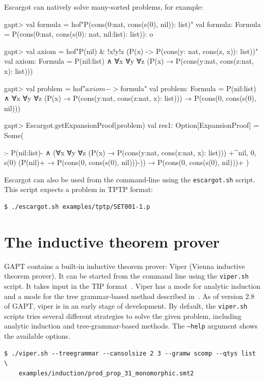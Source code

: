 \documentclass[a4paper,11pt]{book}
\newcommand{\cli}[1]{{\ttfamily {#1}}}
\begin{document}
Escargot can natively solve many-sorted problems, for example:
\begin{clilisting}
gapt> val formula = hof"P(cons(0:nat, cons(s(0), nil)): list)"
val formula: Formula = P(cons(0:nat, cons(s(0): nat, nil:list): list)): o

gapt> val axiom = hof"P(nil) & !x!y!z (P(x) -> P(cons(y: nat, cons(z, x)): list))"
val axiom: Formula = P(nil:list) ∧ ∀x ∀y ∀z (P(x) → P(cons(y:nat, cons(z:nat, x): list)))

gapt> val problem = hof"$axiom -> $formula"
val problem: Formula = P(nil:list) ∧ ∀x ∀y ∀z (P(x) → P(cons(y:nat, cons(z:nat, x): list))) →
  P(cons(0, cons(s(0), nil)))

gapt> Escargot.getExpansionProof(problem)
val res1: Option[ExpansionProof] = Some(
  
:-
P(nil:list)- ∧
    (∀x ∀y ∀z (P(x) → P(cons(y:nat, cons(z:nat, x): list)))
      +^{nil, 0, s(0)} (P(nil)+ → P(cons(0, cons(s(0), nil)))-)) →
  P(cons(0, cons(s(0), nil)))+
)

\end{clilisting}


Escargot can also be used from the command-line using the \texttt{escargot.sh}
script.  This script expects a problem in TPTP format:
\begin{lstlisting}
$ ./escargot.sh examples/tptp/SET001-1.p
\end{lstlisting}

\section{The inductive theorem prover \cli{viper}}

GAPT contains a built-in inductive theorem prover: Viper (Vienna inductive theorem prover). It
can be started from the command line using the \texttt{viper.sh} script. It takes input in the
TIP format~\cite{Claessen15TIP}. Viper has a mode for analytic induction and a mode for
the tree grammar-based method described in~\cite{Eberhard15Inductive}. As of version 2.8 of GAPT,
viper is in an early stage of development.  By default, the \texttt{viper.sh}
scripts tries several different strategies to solve the given problem,
including analytic induction and tree-grammar-based methods.  The
\texttt{--help} argument shows the available options.
\begin{lstlisting}
$ ./viper.sh --treegrammar --cansolsize 2 3 --gramw scomp --qtys list \
    examples/induction/prod_prop_31_monomorphic.smt2
\end{lstlisting}
\end{document}

